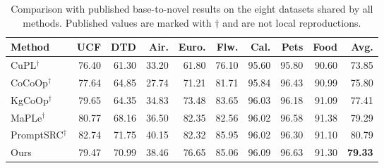 \begin{table}[t]
\centering
\caption{Comparison with published base-to-novel results on the eight datasets shared by all methods. Published values are marked with $\dagger$ and are not local reproductions.}
\label{tab:eight-dataset-literature}
\small
\setlength{\tabcolsep}{3.0pt}
\begin{tabular}{lrrrrrrrrr}
\toprule
Method & UCF & DTD & Air. & Euro. & Flw. & Cal. & Pets & Food & Avg. \\
\midrule
CuPL$^\dagger$ & 76.40 & 61.30 & 33.20 & 61.80 & 76.10 & 95.60 & 95.80 & 90.60 & 73.85 \\
CoCoOp$^\dagger$ & 77.64 & 64.85 & 27.74 & 71.21 & 81.71 & 95.84 & 96.43 & 90.99 & 75.80 \\
KgCoOp$^\dagger$ & 79.65 & 64.35 & 34.83 & 73.48 & 83.65 & 96.03 & 96.18 & 91.09 & 77.41 \\
MaPLe$^\dagger$ & 80.77 & 68.16 & 36.50 & 82.35 & 82.56 & 96.02 & 96.58 & 91.38 & 79.29 \\
PromptSRC$^\dagger$ & 82.74 & 71.75 & 40.15 & 82.32 & 85.95 & 96.02 & 96.30 & 91.10 & 80.79 \\
Ours & 79.47 & 70.99 & 38.46 & 76.65 & 85.06 & 96.09 & 96.63 & 91.30 & \textbf{79.33} \\
\bottomrule
\end{tabular}
\end{table}
